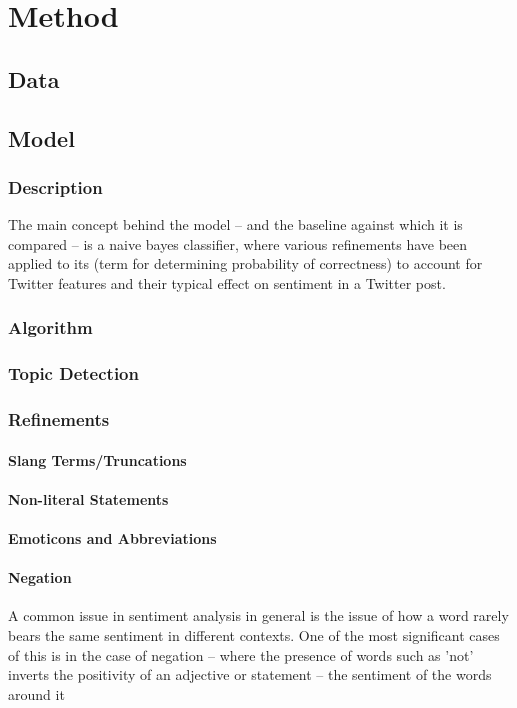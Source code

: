 \documentclass{acm_proc_article-sp}
\begin{document}
\section{Method}
	\subsection{Data}
	\subsection{Model}
		\subsubsection{Description}
		The main concept behind the model -- and the baseline against which it is compared -- is a naive bayes classifier, where various refinements have been applied to its (term for determining probability of correctness) to account for Twitter features and their typical effect on sentiment in a Twitter post.
		\subsubsection{Algorithm}
		\subsubsection{Topic Detection}
		\subsubsection{Refinements}
			\paragraph{Slang Terms/Truncations}
			\paragraph{Non-literal Statements}
			\paragraph{Emoticons and Abbreviations}
			\paragraph{Negation}
			A common issue in sentiment analysis in general is the issue of how a word rarely bears the same sentiment in different contexts. One of the most significant cases of this is in the case of negation -- where the presence of words such as 'not' inverts the positivity of an adjective or statement -- the sentiment of the words around it 
\end{document}
